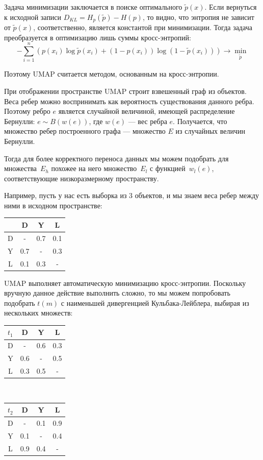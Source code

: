 Задача минимизации заключается в поиске оптимального $\tilde p(x)$. Если вернуться к исходной записи $D_{KL} = H_p(\tilde{p}) - H(p)$, то видно, что энтропия не зависит от $\tilde p(x)$, соответственно, является константой при минимизации. Тогда задача преобразуется в оптимизацию лишь суммы кросс-энтропий:
\[- \sum_{i=1}^n \left(p(x_i)\log \tilde p(x_i) + (1 - p(x_i))\log (1 - \tilde p(x_i))\right) \rightarrow \min_{\tilde p}\]

Поэтому UMAP считается методом, основанным на кросс-энтропии.

При отображении пространстве UMAP строит взвешенный граф из объектов. Веса ребер можно воспринимать как вероятность существования данного ребра. Поэтому ребро $e$ является случайной величиной, имеющей распределение Бернулли: $e \sim B(w(e))$, где $w(e)$ --- вес ребра $e$. Получается, что множество ребер построенного графа --- множество $E$ из случайных величин Бернулли.

Тогда для более корректного переноса данных мы можем подобрать для множества~$E_h$ похожее на него множество~$E_l$ с функцией~$w_l(e)$, соответствующие низкоразмерному пространству.

Например, пусть у нас есть выборка из 3 объектов, и мы знаем веса ребер между ними в исходном пространстве:
\begin{center}
	\begin{tabular}{|c||c|c|c|}
		\hline
		& D & Y & L\\
		\hline
		\hline
		D & - & 0.7 & 0.1\\
		\hline
		Y & 0.7 & - & 0.3\\
		\hline
		L & 0.1 & 0.3 & -\\
		\hline
	\end{tabular}
\end{center}

UMAP выполняет автоматическую минимизацию кросс-энтропии. Поскольку вручную данное действие выполнить сложно, то мы можем попробовать подобрать $t(m)$ с наименьшей дивергенцией Кульбака-Лейблера, выбирая из нескольких множеств:

\begin{center}
	\begin{multicols}{2}
		\begin{tabular}{|c||c|c|c|}
			\hline
			$t_1$ & D & Y & L\\
			\hline
			\hline
			D & - & 0.6 & 0.3\\
			\hline
			Y & 0.6 & - & 0.5\\
			\hline
			L & 0.3 & 0.5 & -\\
			\hline
		\end{tabular}\\
		\begin{tabular}{|c||c|c|c|}
			\hline
			$t_2$ & D & Y & L\\
			\hline
			\hline
			D & - & 0.1 & 0.9\\
			\hline
			Y & 0.1 & - & 0.4\\
			\hline
			L & 0.9 & 0.4 & -\\
			\hline
		\end{tabular}
	\end{multicols}
\end{center}

